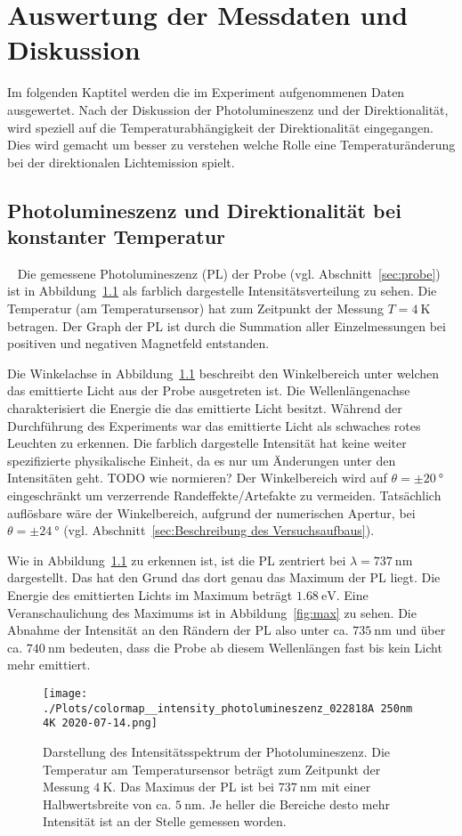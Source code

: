 \chapter{Auswertung der Messdaten und Diskussion}
Im folgenden Kaptitel werden die im Experiment aufgenommenen Daten ausgewertet. 
Nach der Diskussion der Photolumineszenz und der 
Direktionalität, wird speziell auf die Temperaturabhängigkeit der 
Direktionalität eingegangen.
Dies wird gemacht um besser zu verstehen welche Rolle eine Temperaturänderung 
bei der direktionalen Lichtemission spielt.

\section{Photolumineszenz und Direktionalität bei konstanter Temperatur}~\label{sec:PL_u_Direktionalitaet}
Die gemessene Photolumineszenz (PL) der Probe (vgl. Abschnitt~\ref{sec:probe})
ist in Abbildung~\ref{fig:photo} als farblich dargestelle Intensitätsverteilung zu sehen. 
Die Temperatur (am Temperatursensor) hat zum Zeitpunkt der Messung $T = \SI{4}{\kelvin}$ betragen.
Der Graph der PL ist durch die Summation aller Einzelmessungen 
bei positiven und negativen Magnetfeld entstanden. 

Die Winkelachse in Abbildung~\ref{fig:photo} beschreibt den Winkelbereich unter welchen das 
emittierte Licht aus der Probe ausgetreten ist.
Die Wellenlängenachse charakterisiert die Energie die das emittierte Licht besitzt. 
Während der Durchführung des Experiments war das emittierte Licht als schwaches rotes Leuchten zu 
erkennen.
Die farblich dargestelle Intensität hat keine weiter spezifizierte physikalische Einheit, 
da es nur um Änderungen unter den Intensitäten geht. TODO wie normieren?
Der Winkelbereich wird auf $\theta = \pm \SI{20}{\degree}$ 
eingeschränkt um verzerrende Randeffekte/Artefakte zu vermeiden. 
Tatsächlich auflösbare wäre der Winkelbereich, aufgrund der numerischen Apertur, 
bei $\theta = \pm \SI{24}{\degree}$ 
(vgl. Abschnitt~\ref{sec:Beschreibung des Versuchsaufbaus}).

Wie in Abbildung~\ref{fig:photo} zu erkennen ist, ist die PL zentriert bei 
$\lambda = \SI{737}{\nano\meter}$ dargestellt. 
Das hat den Grund das dort genau das Maximum der PL liegt.
Die Energie des emittierten Lichts im Maximum beträgt $\SI{1,68}{\eV}$.
Eine Veranschaulichung des Maximums ist in Abbildung~\ref{fig:max} zu sehen.
Die Abnahme der Intensität an den Rändern der PL also unter ca. $\SI{735}{\nano\meter}$ und über ca. 
$\SI{740}{\nano\meter}$ bedeuten, 
dass die Probe ab diesem Wellenlängen fast bis kein Licht mehr emittiert.
\begin{figure}
    \centering
    \texttt{[image: ./Plots/colormap\_\_intensity\_photolumineszenz\_022818A 250nm 4K 2020-07-14.png]}
    \caption{Darstellung des Intensitätsspektrum der Photolumineszenz.
    Die Temperatur  am Temperatursensor beträgt zum Zeitpunkt der Messung $\SI{4}{\kelvin}$. 
    Das Maximus der PL ist bei $\SI{737}{\nano\meter}$ mit einer Halbwertsbreite von ca. $\SI{5}{\nano\meter}$. 
    Je heller die Bereiche desto mehr Intensität ist an der Stelle gemessen worden.}
    \label{fig:photo}
\end{figure}
\FloatBarrier

